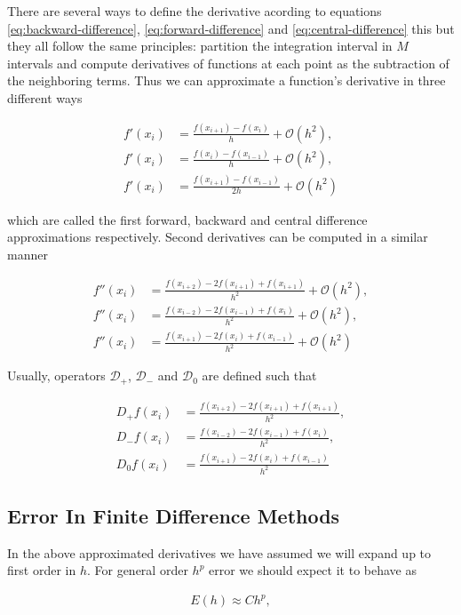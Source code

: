 There are several ways to define the derivative acording to equations \ref{eq:backward-difference}, \ref{eq:forward-difference} and \ref{eq:central-difference} this but they all follow the same principles: partition the integration interval in $M$ intervals and compute derivatives of functions at each point as the subtraction of the neighboring terms. Thus we can approximate a function's derivative in three different ways

\begin{align}
	f'(x_i) &= \frac{f(x_{i+1})-f(x_{i})}{h} + \mathcal{O}(h^2),\\
	f'(x_i) &= \frac{f(x_{i})-f(x_{i-1})}{h} + \mathcal{O}(h^2),\\
	f'(x_i) &= \frac{f(x_{i+1})-f(x_{i-1})}{2h} + \mathcal{O}(h^2)
\end{align}

which are called the first forward, backward and central difference approximations respectively. 
Second derivatives can be computed in a similar manner

\begin{align}
	f''(x_i) &= \frac{f(x_{i+2})-2f(x_{i+1})+f(x_{i+1})}{h^2} + \mathcal{O}(h^2),\\
	f''(x_i) &= \frac{f(x_{i-2})-2f(x_{i-1})+f(x_i)}{h^2} + \mathcal{O}(h^2),\\
	f''(x_i) &= \frac{f(x_{i+1})-2f(x_i)+f(x_{i-1})}{h^2} + \mathcal{O}(h^2)
\end{align}

Usually, operators $\mathcal{D_+}$, $\mathcal{D_-}$ and $\mathcal{D_0}$ are defined such that

\begin{align}
	\label{eq:differnece-operators}
	D_+f(x_i) &= \frac{f(x_{i+2})-2f(x_{i+1})+f(x_{i+1})}{h^2},\\
	D_-f(x_i) &= \frac{f(x_{i-2})-2f(x_{i-1})+f(x_i)}{h^2},\\
	D_0f(x_i) &= \frac{f(x_{i+1})-2f(x_i)+f(x_{i-1})}{h^2}
\end{align}


\subsection{Error In Finite Difference Methods}


In the above approximated derivatives we have assumed we will expand up to first order in $h$. For general order $h^p$ error we should expect it to behave as \cite{leveque_ch1}

\begin{align}
	E(h)\approx Ch^p,
\end{align}

